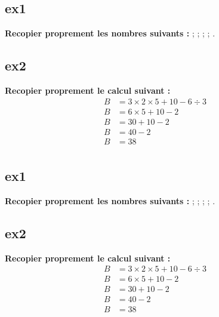 \documentclass[11pt]{article}
\begin{document}
\vspace{1cm}

\begin{multicols}{2}
    \subsection*{ex1}
        
    \textbf{Recopier proprement les nombres suivants :}
     ;  ;  ;  ; .
        
        
    \subsection*{ex2}
        
    \textbf{Recopier proprement le calcul suivant :}
    \begin{align*}
        B &= 3 \times 2 \times 5 + 10 - 6 \div 3  \\
        B &= 6 \times 5 + 10 - 2\\
        B &= 30 + 10 - 2 \\
        B &= 40 - 2\\
        B &= 38\\  
    \end{align*}
\end{multicols}

\vspace{1cm}

\begin{multicols}{2}
    \subsection*{ex1}
        
    \textbf{Recopier proprement les nombres suivants :}
     ;  ;  ;  ; .
        
        
    \subsection*{ex2}
        
    \textbf{Recopier proprement le calcul suivant :}
    \begin{align*}
        B &= 3 \times 2 \times 5 + 10 - 6 \div 3  \\
        B &= 6 \times 5 + 10 - 2\\
        B &= 30 + 10 - 2 \\
        B &= 40 - 2\\
        B &= 38\\  
    \end{align*}
\end{multicols}
\end{document}

